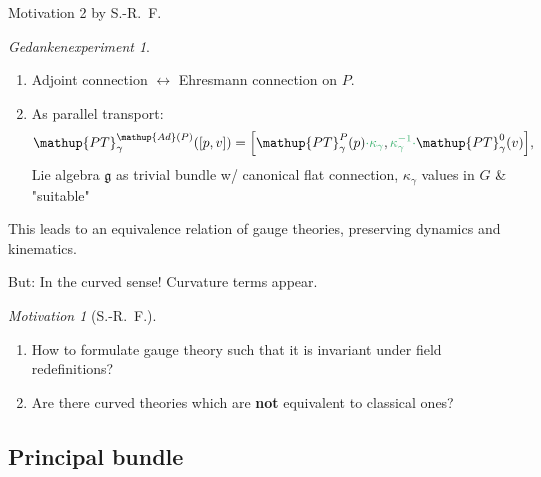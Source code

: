 \documentclass[hyperref={pdfpagelabels=false}]{beamer}
\theoremstyle{plain}
\theoremstyle{remark}
\newtheorem*{gedankenexperiment}{Gedankenexperiment}
\newtheorem*{motivation}{Motivation}
\begin{document}
{\begin{frame}{Motivation 2 by S.-R.\ F.}
	
	\begin{gedankenexperiment}
	\begin{enumerate}
		\item Adjoint connection $\leftrightarrow$ Ehresmann connection on $P$. 
		\item As parallel transport:
		\begin{equation*}
		\mathup{PT}_\gamma^{\mathup{Ad}(P)}([p, v])
		=
		\mleft[ \mathup{PT}_\gamma^P(p){\color[rgb]{0.24,0.7,0.44} \cdot \kappa_\gamma}, {\color[rgb]{0.24,0.7,0.44} \kappa_\gamma^{-1} \cdot} \mathup{PT}_\gamma^0(v) \mright],
		\end{equation*}
		Lie algebra $\mathfrak{g}$ as trivial bundle w/ canonical flat connection, $\kappa_\gamma$ values in $G$ \& "suitable"
	\end{enumerate}
	\end{gedankenexperiment}
\end{frame}


\begin{frame}
\begin{theorem}
This leads to an equivalence relation of gauge theories, preserving dynamics and kinematics.

But: In the {\color[rgb]{0.24,0.7,0.44} curved} sense! Curvature terms appear.
\end{theorem}
\pause
\begin{motivation}[{S.-R.\ F.}]
\begin{enumerate}
	\item How to formulate gauge theory such that it is invariant under field redefinitions?
	\item Are there curved theories which are \textbf{not} equivalent to classical ones?
\end{enumerate}
\end{motivation}


\end{frame}

}

\subsection{Principal bundle}
\end{document}
